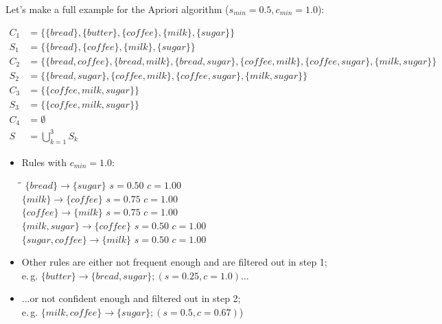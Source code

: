 \begin{frame}
\end{frame}


\begin{frame}
	Let's make a full example for the Apriori algorithm ($s_{min} = 0.5, c_{min} = 1.0$):
	
	\begin{align*}
		C_1 	&= \{ \{ bread \}, \{ butter \}, \{ coffee \}, \{ milk \}, \{ sugar \} \} \\
		S_1 	&= \{ \{ bread \}, \{ coffee \}, \{ milk \}, \{ sugar \} \} \\
		C_2 	&= \{ \{ bread, coffee \}, \{ bread, milk \}, \{ bread, sugar \}, \{ coffee, milk \}, \{ coffee, sugar \}, \{ milk, sugar \} \} \\
		S_2 	&= \{ \{ bread, sugar \}, \{ coffee, milk \}, \{ coffee, sugar \}, \{ milk, sugar \} \} \\
		C_3 	&= \{ \{ coffee, milk, sugar \} \} \\
		S_3 	&= \{ \{ coffee, milk, sugar \} \} \\
		C_4 	&= \emptyset \\
		S 	&= \bigcup_{k=1}^3 S_k
	\end{align*}
\end{frame}


\begin{frame}
	\begin{itemize}
		\item Rules with $c_{min} = 1.0$:
		\begin{tabbing}
			\hspace*{5cm}\=\hspace*{3cm}\=\kill
			$\{ bread \} \rightarrow \{ sugar \}$		\>	$s = 0.50$		\>	$c = 1.00$ 	\\[1.5mm]
			$\{ milk \} \rightarrow \{ coffee \}$		\>	$s = 0.75$		\>	$c = 1.00$ 	\\[1.5mm]
			$\{ coffee \} \rightarrow \{ milk \}$ 		\>	$s = 0.75$		\>	$c = 1.00$		\\[1.5mm]
			$\{ milk, sugar \} \rightarrow \{ coffee \}$	\>	$s = 0.50$		\>	$c = 1.00$		\\[1.5mm]
			$\{ sugar, coffee \} \rightarrow \{ milk \}$	\>	$s = 0.50$		\>	$c = 1.00$
		\end{tabbing}
		\item Other rules are either not frequent enough and are filtered out in step 1; \\
			e.\,g. $\{ butter \} \rightarrow \{ bread, sugar \}; (s = 0.25, c = 1.0)$...
		\item ...or not confident enough and filtered out in step 2; \\
			e.\,g. $\{ milk, coffee \} \rightarrow \{ sugar \}; (s = 0.5, c = 0.67)$)
	\end{itemize}
\end{frame}



